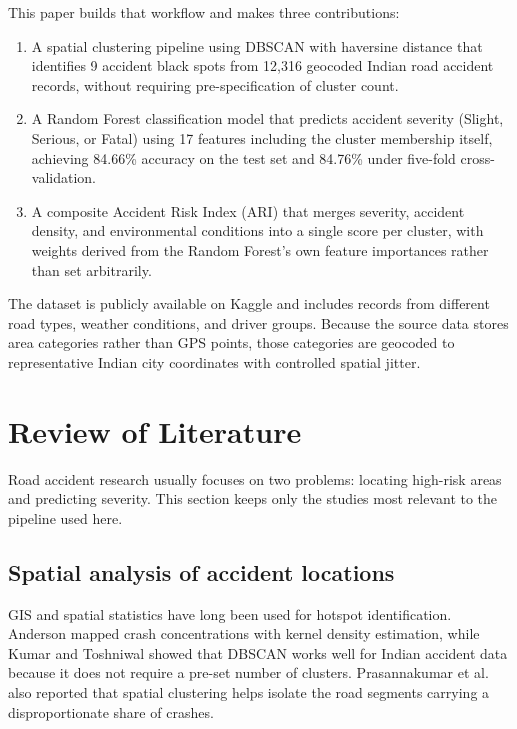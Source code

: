 \documentclass[conference]{IEEEtran}
\begin{document}
This paper builds that workflow and makes three contributions:

\begin{enumerate}
\item A spatial clustering pipeline using DBSCAN with haversine distance that identifies 9 accident black spots from 12,316 geocoded Indian road accident records, without requiring pre-specification of cluster count.

\item A Random Forest classification model that predicts accident severity (Slight, Serious, or Fatal) using 17 features including the cluster membership itself, achieving 84.66\% accuracy on the test set and 84.76\% under five-fold cross-validation.

\item A composite Accident Risk Index (ARI) that merges severity, accident density, and environmental conditions into a single score per cluster, with weights derived from the Random Forest's own feature importances rather than set arbitrarily.
\end{enumerate}

The dataset is publicly available on Kaggle and includes records from different road types, weather conditions, and driver groups. Because the source data stores area categories rather than GPS points, those categories are geocoded to representative Indian city coordinates with controlled spatial jitter.

\section{Review of Literature}

Road accident research usually focuses on two problems: locating high-risk areas and predicting severity. This section keeps only the studies most relevant to the pipeline used here.

\subsection{Spatial analysis of accident locations}

GIS and spatial statistics have long been used for hotspot identification. Anderson \cite{b4} mapped crash concentrations with kernel density estimation, while Kumar and Toshniwal \cite{b6} showed that DBSCAN works well for Indian accident data because it does not require a pre-set number of clusters. Prasannakumar et al. \cite{b8} also reported that spatial clustering helps isolate the road segments carrying a disproportionate share of crashes.
\end{document}
